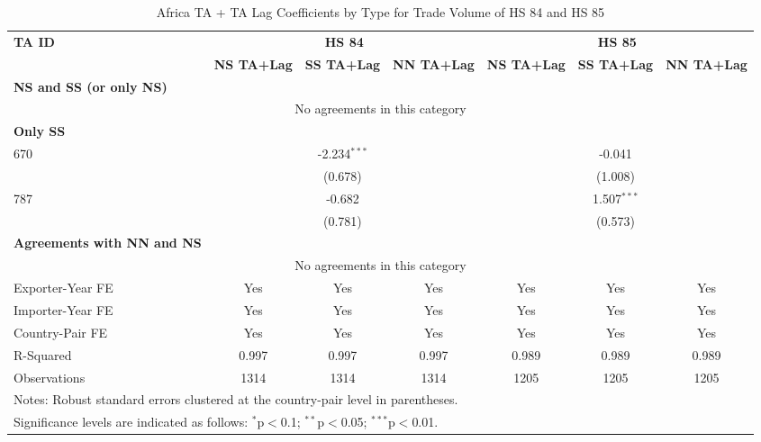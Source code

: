 \begin{table}[htbp]
    \centering
    \caption{Africa TA + TA Lag Coefficients by Type for Trade Volume of HS 84 and HS 85}
    \label{tab:HS_trade_africa_pta}
    \begin{adjustbox}{max width=\textwidth}
    \begin{tabular}{lcccccc}
    \hline
    \textbf{TA ID} & \multicolumn{3}{c}{\textbf{HS 84}} & \multicolumn{3}{c}{\textbf{HS 85}} \\
    & \textbf{NS TA+Lag} & \textbf{SS TA+Lag} & \textbf{NN TA+Lag} & \textbf{NS TA+Lag} & \textbf{SS TA+Lag} & \textbf{NN TA+Lag} \\
    \hline
    \textbf{NS and SS (or only NS)} &  &  &  &  &  &  \\
    \hline
    \multicolumn{7}{c}{No agreements in this category} \\
    \hline
    \textbf{Only SS} &  &  &  &  &  &  \\
    \hline
    670 &  & -2.234$^{\ast\ast\ast}$ &  &  & -0.041 &  \\
    &  & (0.678) &  &  & (1.008) &  \\
    787 &  & -0.682 &  &  & 1.507$^{\ast\ast\ast}$ &  \\
    &  & (0.781) &  &  & (0.573) &  \\
    \hline
    \textbf{Agreements with NN and NS} &  &  &  &  &  &  \\
    \hline
    \multicolumn{7}{c}{No agreements in this category} \\
    \hline
    Exporter-Year FE & Yes & Yes & Yes & Yes & Yes & Yes \\
    Importer-Year FE & Yes & Yes & Yes & Yes & Yes & Yes \\
    Country-Pair FE & Yes & Yes & Yes & Yes & Yes & Yes \\
    R-Squared & 0.997 & 0.997 & 0.997 & 0.989 & 0.989 & 0.989 \\
    Observations & 1314 & 1314 & 1314 & 1205 & 1205 & 1205 \\
    \hline
    \multicolumn{7}{l}{\footnotesize{Notes: Robust standard errors clustered at the country-pair level in parentheses.}} \\
    \multicolumn{7}{l}{\footnotesize{Significance levels are indicated as follows: $^{\ast}$p$<$0.1; $^{\ast\ast}$p$<$0.05; $^{\ast\ast\ast}$p$<$0.01.}} \\
    \end{tabular}
    \end{adjustbox}
\end{table}
